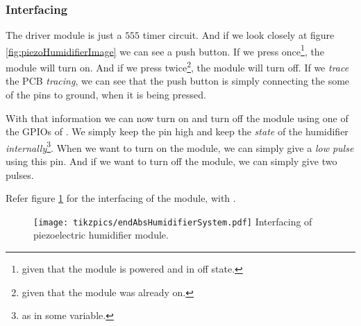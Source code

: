 \documentclass[../../main]{subfiles}
\begin{document}
\subsubsection{Interfacing}

The driver module is just a $555$ timer circuit. And if we look closely at figure \ref{fig:piezoHumidifierImage}
we can see a push button. If we press once\footnote{given that the module is powered and in off state.}, the
module will turn on. And if we press twice\footnote{given that the module was already on.}, the module will
turn off. If we \emph{trace} the PCB \emph{tracing}, we can see that the push button is simply connecting the
some of the pins to ground, when it is being pressed.

With that information we can now turn on and turn off the module using one of the GPIOs of \esp. We simply
keep the pin high and keep the \emph{state} of the humidifier \emph{internally}\footnote{as in some variable.}.
When we want to turn on the module, we can simply give a \emph{low pulse} using this pin. And if we want
to turn off the module, we can simply give two pulses.

Refer figure \ref{fig:absHumidifierSystem} for the interfacing of the module, with \esp.

\begin{figure}
    \centering
    \texttt{[image: tikzpics/endAbsHumidifierSystem.pdf]}
     {Interfacing of piezoelectric humidifier module.}
    \label{fig:absHumidifierSystem}
\end{figure}


\end{document}
